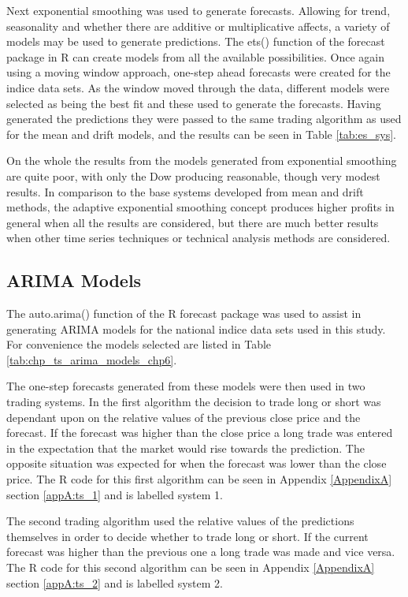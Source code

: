 Next exponential smoothing was used to  generate forecasts. Allowing for trend, seasonality and whether there are additive or multiplicative affects, a variety of models may be used to generate predictions. The ets() function of the forecast package in R can create models from all the available possibilities. Once again using a moving window approach, one-step ahead forecasts were created for the indice data sets. As the window moved through the data, different models were selected as being the best fit and these used to generate the forecasts. Having generated the predictions they were passed to the same trading algorithm as used for the mean and drift models, and the results can be seen in Table \ref{tab:es_sys}. 

On the whole the results from the models generated from exponential smoothing are quite poor, with only the Dow producing reasonable, though very modest results. In comparison to the base systems developed from mean and drift methods, the adaptive exponential smoothing concept produces higher profits in general when all the results are considered, but there are much better results when other time series techniques or technical analysis methods are considered.

\subsection{ARIMA Models}
The auto.arima() function of the R forecast package was used to assist in generating ARIMA models for the national indice data sets used in this study. For convenience the models selected are listed in Table \ref{tab:chp_ts_arima_models_chp6}.



The one-step forecasts generated from these models were then used in two trading systems. In the first algorithm the decision to trade long or short was dependant upon on the relative values of the previous close price and the forecast. If the forecast was higher than the close price a long trade was entered in the expectation that the market would rise towards the prediction. The opposite situation was expected for when the forecast was lower than the close price. The R code for this first algorithm can be seen in Appendix \ref{AppendixA} section \ref{appA:ts_1} and is labelled system 1.

The second trading algorithm used the relative values of the predictions themselves in order to decide whether to trade long or short. If the current forecast was higher than the previous one a long trade was made and vice versa.  The R code for this second algorithm can be seen in Appendix \ref{AppendixA} section \ref{appA:ts_2} and is labelled system 2.


